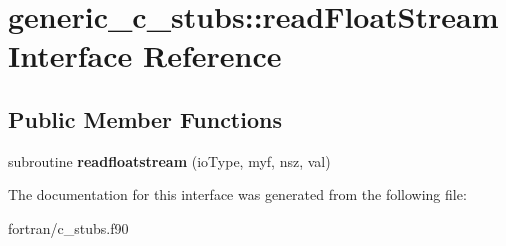 \hypertarget{interfacegeneric__c__stubs_1_1read_float_stream}{}\section{generic\+\_\+c\+\_\+stubs\+:\+:read\+Float\+Stream Interface Reference}
\label{interfacegeneric__c__stubs_1_1read_float_stream}
\subsection*{Public Member Functions}
\begin{DoxyCompactItemize}
\item 
\mbox{\label{interfacegeneric__c__stubs_1_1read_float_stream_a4df25125ab35caeaac33a2739d8c8f61}} 
subroutine {\bfseries readfloatstream} (io\+Type, myf, nsz, val)
\end{DoxyCompactItemize}


The documentation for this interface was generated from the following file\+:\begin{DoxyCompactItemize}
\item 
fortran/c\+\_\+stubs.\+f90\end{DoxyCompactItemize}
